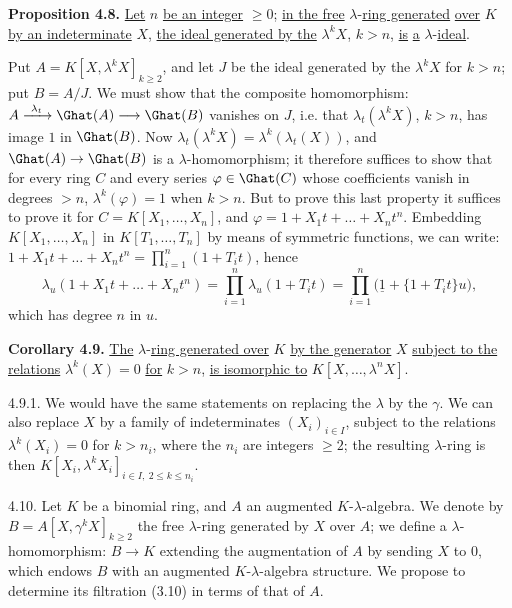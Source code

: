 \textbf{Proposition 4.8.} \uline{Let} \(n\) \uline{be an integer} \(\ge0\); \uline{in the free} \(\lambda\)-\uline{ring generated} \uline{over} \(K\) \uline{by an indeterminate} \(X\), \uline{the ideal generated by the} \(\lambda^k X\), \(k>n\), \uline{is} \uline{a} \(\lambda\)-\uline{ideal}.

Put \(A=K[X,\lambda^k X]_{k\ge2}\), and let \(J\) be the ideal generated by the \(\lambda^k X\) for \(k>n\); put \(B=A/J\). We must show that the composite homomorphism: \(A\xrightarrow{\ \lambda_t\ }\Ghat(A)\longrightarrow\Ghat(B)\) vanishes on \(J\), i.e. that \(\lambda_t(\lambda^k X)\), \(k>n\), has image \(1\) in \(\Ghat(B)\). Now \(\lambda_t(\lambda^k X)=\lambda^k(\lambda_t(X))\), and \(\Ghat(A)\to\Ghat(B)\) is a \(\lambda\)-homomorphism; it therefore suffices to show that for every ring \(C\) and every series \(\varphi\in\Ghat(C)\) whose coefficients vanish in degrees \(>n\), \(\lambda^k(\varphi)=1\) when \(k>n\). But to prove this last property it suffices to prove it for \(C=K[X_1,\ldots,X_n]\), and \(\varphi=1+X_1t+\ldots+X_nt^n\). Embedding \(K[X_1,\ldots,X_n]\) in \(K[T_1,\ldots,T_n]\) by means of symmetric functions, we can write: \(1+X_1t+\ldots+X_nt^n=\prod_{i=1}^{n}(1+T_it)\), hence
\[
  \lambda_u(1+X_1t+\ldots+X_nt^n)=\prod_{i=1}^{n}\lambda_u(1+T_it)=\prod_{i=1}^{n}\bigl(\underline{1}+\{1+T_it\}u\bigr),
\]
which has degree \(n\) in \(u\).

\textbf{Corollary 4.9.} \uline{The} \(\lambda\)-\uline{ring generated over} \(K\) \uline{by the generator} \(X\) \uline{subject to the relations} \(\lambda^k(X)=0\) \uline{for} \(k>n\), \uline{is isomorphic to} \(K[X,\ldots,\lambda^n X]\).

4.9.1. We would have the same statements on replacing the \(\lambda\) by the \(\gamma\). We can also replace \(X\) by a family of indeterminates \((X_i)_{i\in I}\), subject to the relations \(\lambda^k(X_i)=0\) for \(k>n_i\), where the \(n_i\) are integers \(\ge2\); the resulting \(\lambda\)-ring is then \(K[X_i,\lambda^k X_i]_{i\in I,\ 2\le k\le n_i}\).

4.10. Let \(K\) be a binomial ring, and \(A\) an augmented \(K\)-\(\lambda\)-algebra. We denote by \(B=A[X,\gamma^k X]_{k\ge2}\) the free \(\lambda\)-ring generated by \(X\) over \(A\);
%
we define a \(\lambda\)-homomorphism: \(B\to K\) extending the augmentation of \(A\) by sending \(X\) to \(0\), which endows \(B\) with an augmented \(K\)-\(\lambda\)-algebra structure. We propose to determine its filtration (3.10) in terms of that of \(A\).

